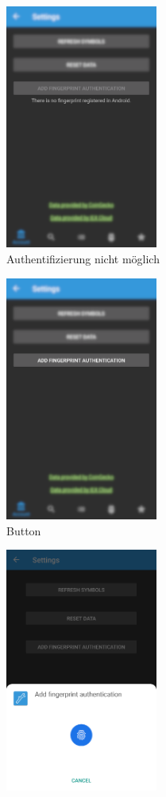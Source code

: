 \documentclass[a4paper]{article}
\begin{document}
\begin{figure}[H]
    \begin{subfigure}{.5\textwidth}
        \centering
        \includegraphics[height=8cm,keepaspectratio]{./images/settings/fingerprint_not_registered.png}
        \caption{Authentifizierung nicht möglich}
        \label{fig:functionality:settings:fingerprint:notregistered}
    \end{subfigure}
    \begin{subfigure}{.5\textwidth}
        \centering
        \includegraphics[height=8cm,keepaspectratio]{./images/settings/fingerprint_button.png}
        \caption{Button}
        \label{fig:functionality:settings:fingerprint:button}
    \end{subfigure}
    \begin{subfigure}{.5\textwidth}
        \centering
        \includegraphics[height=8cm,keepaspectratio]{./images/settings/fingerprint_add_requested.png}

\end{subfigure}
\end{figure}
\end{document}
